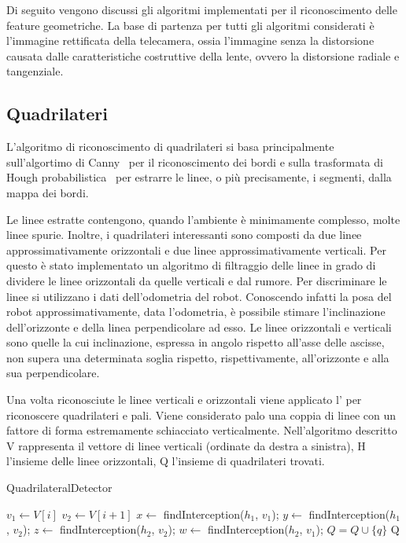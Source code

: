 Di seguito vengono discussi gli algoritmi implementati per il riconoscimento delle feature geometriche.
La base di partenza per tutti gli algoritmi considerati è l'immagine rettificata della telecamera, ossia l'immagine senza la distorsione causata dalle caratteristiche costruttive della lente, ovvero la distorsione radiale e tangenziale.

\subsection{Quadrilateri}

L'algoritmo di riconoscimento di quadrilateri si basa principalmente sull'algortimo di Canny~\cite{4767851} per il riconoscimento dei bordi e sulla trasformata di Hough probabilistica~\cite{matas2000robust} per estrarre le linee, o più precisamente, i segmenti, dalla mappa dei bordi.

Le linee estratte contengono, quando l'ambiente è minimamente complesso, molte linee spurie. Inoltre, i quadrilateri interessanti sono composti da due linee approssimativamente orizzontali e due linee approssimativamente verticali. Per questo è stato implementato un algoritmo di filtraggio delle linee in grado di dividere le linee orizzontali da quelle verticali e dal rumore. Per discriminare le linee si utilizzano i dati dell'odometria del robot. Conoscendo infatti la posa del robot approssimativamente, data l'odometria, è possibile stimare l'inclinazione dell'orizzonte e della linea perpendicolare ad esso. Le linee orizzontali e verticali sono quelle la cui inclinazione, espressa in angolo rispetto all'asse delle ascisse, non supera una determinata soglia rispetto, rispettivamente, all'orizzonte e alla sua perpendicolare.

Una volta riconosciute le linee verticali e orizzontali viene applicato l' per riconoscere quadrilateri e pali.
Viene considerato palo una coppia di linee con un fattore di forma estremamente schiacciato verticalmente. Nell'algoritmo descritto V rappresenta il vettore di linee verticali (ordinate da destra a sinistra), H l'insieme delle linee orizzontali, Q l'insieme di quadrilateri trovati.

\begin{algorithm}[ht]
\caption{QuadrilateralDetector}
\begin{algorithmic}[1] 
\label{alg:quad-det}
  \STATE $v_{1} \leftarrow V[i]$
  \STATE $v_{2} \leftarrow V[i+1]$
      \STATE $x \leftarrow$ findInterception($h_{1}$, $v_{1}$);
      \STATE $y \leftarrow$ findInterception($h_{1}$, $v_{2}$);
      \STATE $z \leftarrow$ findInterception($h_{2}$, $v_{2}$);
      \STATE $w \leftarrow$ findInterception($h_{2}$, $v_{1}$);
	\STATE $Q = Q \cup \lbrace q \rbrace$
      \ENDIF
    \ENDFOR
  \ENDIF
\ENDFOR
\RETURN Q
\end{algorithmic}
\end{algorithm}

